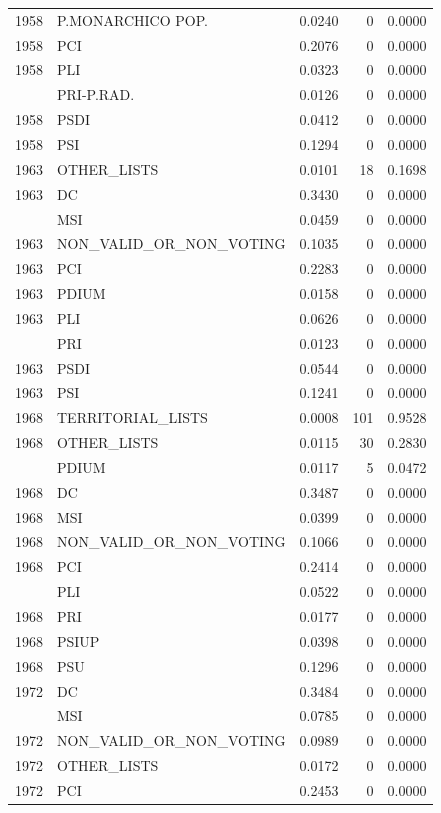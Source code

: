 \begin{longtable}[t]{rlrrr}
1958 & P.MONARCHICO POP. & 0.0240 & 0 & 0.0000\\
1958 & PCI & 0.2076 & 0 & 0.0000\\
1958 & PLI & 0.0323 & 0 & 0.0000\\
\addlinespace
1958 & PRI-P.RAD. & 0.0126 & 0 & 0.0000\\
1958 & PSDI & 0.0412 & 0 & 0.0000\\
1958 & PSI & 0.1294 & 0 & 0.0000\\
1963 & OTHER\_LISTS & 0.0101 & 18 & 0.1698\\
1963 & DC & 0.3430 & 0 & 0.0000\\
\addlinespace
1963 & MSI & 0.0459 & 0 & 0.0000\\
1963 & NON\_VALID\_OR\_NON\_VOTING & 0.1035 & 0 & 0.0000\\
1963 & PCI & 0.2283 & 0 & 0.0000\\
1963 & PDIUM & 0.0158 & 0 & 0.0000\\
1963 & PLI & 0.0626 & 0 & 0.0000\\
\addlinespace
1963 & PRI & 0.0123 & 0 & 0.0000\\
1963 & PSDI & 0.0544 & 0 & 0.0000\\
1963 & PSI & 0.1241 & 0 & 0.0000\\
1968 & TERRITORIAL\_LISTS & 0.0008 & 101 & 0.9528\\
1968 & OTHER\_LISTS & 0.0115 & 30 & 0.2830\\
\addlinespace
1968 & PDIUM & 0.0117 & 5 & 0.0472\\
1968 & DC & 0.3487 & 0 & 0.0000\\
1968 & MSI & 0.0399 & 0 & 0.0000\\
1968 & NON\_VALID\_OR\_NON\_VOTING & 0.1066 & 0 & 0.0000\\
1968 & PCI & 0.2414 & 0 & 0.0000\\
\addlinespace
1968 & PLI & 0.0522 & 0 & 0.0000\\
1968 & PRI & 0.0177 & 0 & 0.0000\\
1968 & PSIUP & 0.0398 & 0 & 0.0000\\
1968 & PSU & 0.1296 & 0 & 0.0000\\
1972 & DC & 0.3484 & 0 & 0.0000\\
\addlinespace
1972 & MSI & 0.0785 & 0 & 0.0000\\
1972 & NON\_VALID\_OR\_NON\_VOTING & 0.0989 & 0 & 0.0000\\
1972 & OTHER\_LISTS & 0.0172 & 0 & 0.0000\\
1972 & PCI & 0.2453 & 0 & 0.0000\\

\end{longtable}

